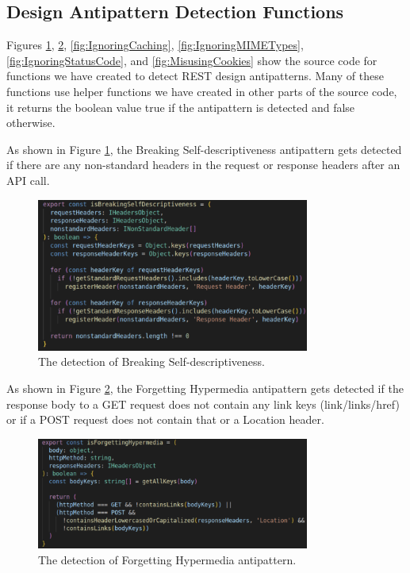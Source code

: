 \subsection{Design Antipattern Detection Functions}

Figures \ref{fig:BreakingSelf-descriptiveness}, \ref{fig:ForgettingHypermedia}, \ref{fig:IgnoringCaching}, \ref{fig:IgnoringMIMETypes}, \ref{fig:IgnoringStatusCode}, and \ref{fig:MisusingCookies} show the source code for functions we have created to detect REST design antipatterns. Many of these functions use helper functions we have created in other parts of the source code, it returns the boolean value true if the antipattern is detected and false otherwise.

As shown in Figure \ref{fig:BreakingSelf-descriptiveness}, the Breaking Self-descriptiveness antipattern gets detected if there are any non-standard headers in the request or response headers after an API call.

\begin{figure}[h!]
 \centering
 \includegraphics[width=0.8\textwidth]{img/breakingSelfDescriptiveness.png}
 \caption{The detection of Breaking Self-descriptiveness.}
 \label{fig:BreakingSelf-descriptiveness}
\end{figure}

As shown in Figure \ref{fig:ForgettingHypermedia}, the Forgetting Hypermedia antipattern gets detected if the response body to a GET request does not contain any link keys (link/links/href) or if a POST request does not contain that or a Location header.

\begin{figure}[h!]
 \centering
 \includegraphics[width=0.8\textwidth]{img/forgettingHyperMedia.png}
 \caption{The detection of Forgetting Hypermedia antipattern.}
 \label{fig:ForgettingHypermedia}
\end{figure}

